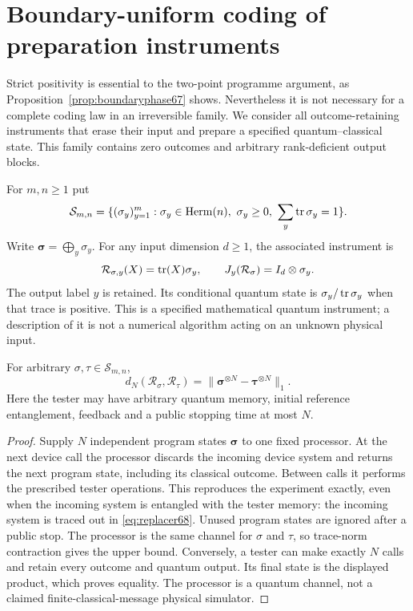 \section{Boundary-uniform coding of preparation instruments}\label{sec:boundarycode68}
Strict positivity is essential to the two-point programme argument, as
Proposition~\ref{prop:boundaryphase67} shows. Nevertheless it is not
necessary for a complete coding law in an irreversible family. We
consider all outcome-retaining instruments that erase their input and
prepare a specified quantum--classical state. This family contains zero
outcomes and arbitrary rank-deficient output blocks.

For $m,n\ge1$ put
\[
 \mathcal S_{m,n}=\{(\sigma_y)_{y=1}^m:\sigma_y\in\operatorname{Herm}(n),
                  \ \sigma_y\ge0,\ \sum_y\operatorname{tr}\sigma_y=1\}.
\]
Write $\boldsymbol\sigma=\bigoplus_y\sigma_y$. For any input
dimension $d\ge1$, the associated instrument is
\begin{equation}\label{eq:replacer68}
 \mathcal R_{\sigma,y}(X)=\operatorname{tr}(X)\sigma_y,\qquad
 J_y(\mathcal R_\sigma)=I_d\otimes\sigma_y.
\end{equation}
The output label $y$ is retained. Its conditional quantum state is
$\sigma_y/\operatorname{tr}\sigma_y$ when that trace is positive. This is a
specified mathematical quantum instrument; a description of it is not
a numerical algorithm acting on an unknown physical input.

\begin{lemma}\label{lem:productreplacer68}
For arbitrary $\sigma,\tau\in\mathcal S_{m,n}$,
\begin{equation}\label{eq:productreplacer68}
 d_N(\mathcal R_\sigma,\mathcal R_\tau)
   =\|\boldsymbol\sigma^{\otimes N}
                -\boldsymbol\tau^{\otimes N}\|_1.
\end{equation}
Here the tester may have arbitrary quantum memory, initial reference
entanglement, feedback and a public stopping time at most $N$.
\end{lemma}
\begin{proof}
Supply $N$ independent program states $\boldsymbol\sigma$ to one
fixed processor. At the next device call the processor discards the
incoming device system and returns the next program state, including
its classical outcome. Between calls it performs the prescribed tester
operations. This reproduces the experiment exactly, even when the
incoming system is entangled with the tester memory: the incoming
system is traced out in \eqref{eq:replacer68}. Unused program states
are ignored after a public stop. The processor is the same channel
for $\sigma$ and $\tau$, so trace-norm contraction gives the upper
bound. Conversely, a tester can make exactly $N$ calls and retain
every outcome and quantum output. Its final state is the displayed
product, which proves equality. The processor is a quantum channel,
not a claimed finite-classical-message physical simulator.
\end{proof}

